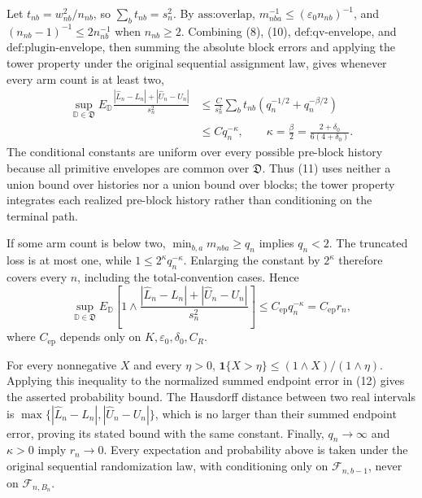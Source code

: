 Let \(t_{nb}=w_{nb}^2/n_{nb}\), so \(\sum_bt_{nb}=s_n^2\). By \(\text{ass:overlap}\), \(m_{nba}^{-1}\le(\varepsilon_0n_{nb})^{-1}\), and \((n_{nb}-1)^{-1}\le2n_{nb}^{-1}\) when \(n_{nb}\ge2\). Combining (8), (10), \(\text{def:qv-envelope}\), and \(\text{def:plugin-envelope}\), then summing the absolute block errors and applying the tower property under the original sequential assignment law, gives whenever every arm count is at least two,
\[
\begin{aligned}
\sup_{\mathbb D\in\mathfrak D}
E_{\mathbb D}\frac{|\widehat L_n-L_n|+|\widehat U_n-U_n|}{s_n^2}
&\le\frac{C}{s_n^2}\sum_bt_{nb}
\left(q_n^{-1/2}+q_n^{-\beta/2}\right)\\
&\le Cq_n^{-\kappa},
\qquad
\kappa=\frac\beta2=\frac{2+\delta_0}{6(4+\delta_0)}.
\end{aligned}
\tag{11}
\]
The conditional constants are uniform over every possible pre-block history because all primitive envelopes are common over \(\mathfrak D\). Thus (11) uses neither a union bound over histories nor a union bound over blocks; the tower property integrates each realized pre-block history rather than conditioning on the terminal path.

If some arm count is below two, \(\min_{b,a}m_{nba}\ge q_n\) implies \(q_n<2\). The truncated loss is at most one, while \(1\le2^\kappa q_n^{-\kappa}\). Enlarging the constant by \(2^\kappa\) therefore covers every \(n\), including the total-convention cases. Hence
\[
\sup_{\mathbb D\in\mathfrak D}E_{\mathbb D}\left[1\wedge
\frac{|\widehat L_n-L_n|+|\widehat U_n-U_n|}{s_n^2}\right]
\le C_{\mathrm{ep}}q_n^{-\kappa}=C_{\mathrm{ep}}r_n,
\tag{12}
\]
where \(C_{\mathrm{ep}}\) depends only on \(K,\varepsilon_0,\delta_0,C_R\).

For every nonnegative \(X\) and every \(\eta>0\),
\(\mathbf1\{X>\eta\}\le(1\wedge X)/(1\wedge\eta)\). Applying this inequality to the normalized summed endpoint error in (12) gives the asserted probability bound. The Hausdorff distance between two real intervals is
\(\max\{|\widehat L_n-L_n|,|\widehat U_n-U_n|\}\), which is no larger than their summed endpoint error, proving its stated bound with the same constant. Finally, \(q_n\to\infty\) and \(\kappa>0\) imply \(r_n\to0\). Every expectation and probability above is taken under the original sequential randomization law, with conditioning only on \(\mathcal F_{n,b-1}\), never on \(\mathcal F_{n,B_n}\).